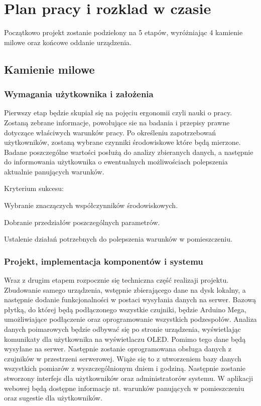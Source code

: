\documentclass[10pt, a4paper]{article}
\begin{document}
\section{Plan pracy i rozklad w czasie}

Początkowo projekt zostanie podzielony na 5 etapów, wyróżniając 4 kamienie milowe oraz końcowe oddanie urządzenia. 
\subsection{Kamienie milowe}

\subsubsection{Wymagania użytkownika i założenia}
Pierwszy etap będzie skupiał się na pojęciu ergonomii czyli nauki o pracy. Zostaną zebrane informacje, powołujące sie na badania i przepisy prawne dotyczące właściwych warunków pracy. 
Po określeniu zapotrzebowań użytkowników, zostaną wybrane czynniki środowiskowe które będą mierzone. Badane poszczególne wartości posłużą do analizy zbieranych danych, a następnie do informowania użytkownika o ewentualnych możliwościach polepszenia aktualnie panujących warunków.

\begin{description}[font=$\bullet$~\normalfont]
\item Kryterium sukcesu:
	\begin{description}[font=$\bullet$~\normalfont]
	\item Wybranie znaczączych współczynników środowiskowych.
	\item Dobranie przedziałów poszczególnych parametrów.
	\item Ustalenie działań potrzebnych do polepszenia warunków w pomieszczeniu.
	\end{description}
\end{description}


\subsubsection{Projekt, implementacja komponentów i systemu}
Wraz z drugim etapem rozpocznie się techniczna część realizaji projektu. Zbudowanie samego urządzenia, wstępnie zbierającego dane na dysk lokalny, a następnie dodanie funkcjonalności w postaci wysyłania danych na serwer. Bazową płytką, do której będą podłączonego wszystkie czujniki, będzie Arduino Mega, umożliwiające podłączenie oraz oprogramowanie wszystkich podzespołów. Analiza danych poimarowych będzie odbywać się po stronie urządzenia, wyświetlając komunikaty dla użytkownika na wyświetlaczu OLED. Pomimo tego dane będą wysyłane na serwer.
Następnie zostanie oprogramowana obsługa danych z czujników w przestrzeni serwerowej. Wiąże się to z utworzeniem bazy danych wszystkich pomiarów z wyszczególnionym dniem i godziną. Następnie zostanie stworzony interfejs dla użytkowników oraz administratorów systemu. W aplikacji webowej będą dostępne informacje nt. warunków panujących w pomieszczeniu oraz sugestie dla użytkowników.
\end{document}
